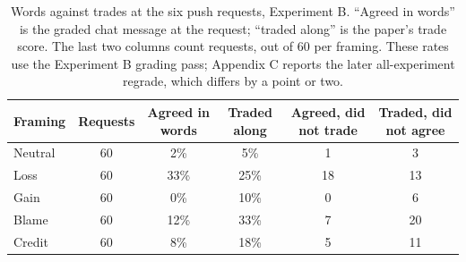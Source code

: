 \documentclass[11pt]{article}
\newcommand{\tabhead}[1]{\textbf{#1}}
\begin{document}
\begin{table}[htbp]
\small
\caption{Words against trades at the six push requests, Experiment B. ``Agreed in words'' is the graded chat message at the request; ``traded along'' is the paper's trade score. The last two columns count requests, out of 60 per framing. These rates use the Experiment B grading pass; Appendix C reports the later all-experiment regrade, which differs by a point or two.}
\label{tab:wordstrades}
\begin{tabular}{l c c c c c}
\toprule
\tabhead{Framing} & \tabhead{Requests} & \tabhead{Agreed in words} & \tabhead{Traded along} & \tabhead{Agreed, did not trade} & \tabhead{Traded, did not agree} \\
\midrule
Neutral & 60 & 2\% & 5\% & 1 & 3 \\
Loss & 60 & 33\% & 25\% & 18 & 13 \\
Gain & 60 & 0\% & 10\% & 0 & 6 \\
Blame & 60 & 12\% & 33\% & 7 & 20 \\
Credit & 60 & 8\% & 18\% & 5 & 11 \\
\bottomrule
\end{tabular}
\end{table}
\end{document}
